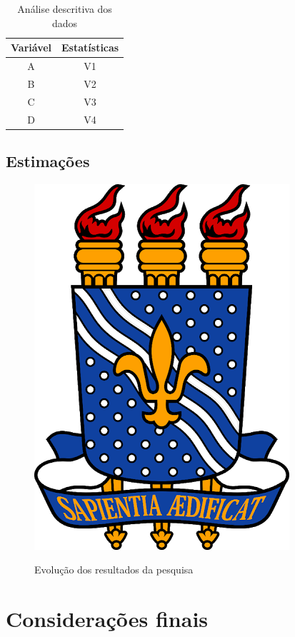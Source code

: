 \lipsum[1-2]

\begin{table}[H]
    \centering
    \caption{Análise descritiva dos dados}
    \begin{tabular}{c|c}
        \hline
         \textbf{Variável} & \textbf{Estatísticas}  \\ \hline
         A & V1\\
         B & V2\\
         C & V3\\
         D & V4\\ \hline
    \end{tabular}
    \label{tab:my_tab}
\end{table}

\section{Estimações}

\lipsum[1-2]

\begin{figure}
    \centering
    \caption{Evolução dos resultados da pesquisa}
    \includegraphics[scale=0.3]{config/logo-ufpb.png}
    \label{fig:my_fig}
\end{figure}

\chapter{Considerações finais}

\lipsum[1-5]


